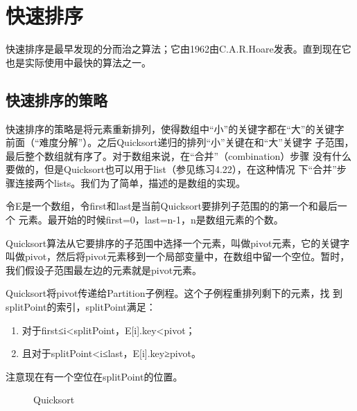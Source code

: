 \section{快速排序}\label{Sec:QuickSort}
快速排序是最早发现的分而治之算法；它由1962由C.A.R.Hoare发表。直到现在它
也是实际使用中最快的算法之一。

\subsection{快速排序的策略}
快速排序的策略是将元素重新排列，使得数组中“小”的关键字都在“大”的关键字
前面（“难度分解”）。之后Quicksort递归的排列“小”关键在和“大”关键字
子范围，最后整个数组就有序了。对于数组来说，在“合并”（combination）步骤
没有什么要做的，但是Quicksort也可以用于list（参见练习4.22），在这种情况
下“合并”步骤连接两个lists。我们为了简单，描述的是数组的实现。

令E是一个数组，令first和last是当前Quicksort要排列子范围的的第一个和最后一个
元素。最开始的时候first=0，last=n-1，n是数组元素的个数。

Quicksort算法从它要排序的子范围中选择一个元素，叫做pivot元素，它的关键字
叫做pivot，然后将pivot元素移到一个局部变量中，在数组中留一个空位。暂时，
我们假设子范围最左边的元素就是pivot元素。

Quicksort将pivot传递给Partition子例程。这个子例程重排列剩下的元素，找
到splitPoint的索引，splitPoint满足：
\begin{enumerate}
\item 对于first≤i<splitPoint，E[i].key<pivot；
\item 且对于splitPoint<i≤last，E[i].key≥pivot。
\end{enumerate}
注意现在有一个空位在splitPoint的位置。

\begin{figure*}[!t]
    \centering
    \caption{Quicksort}
    \label{Fig:ExampleofQuicksort}
\end{figure*}

